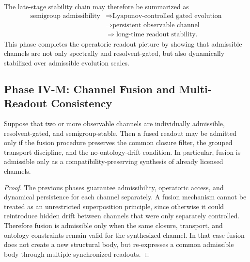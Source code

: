 \begin{remark}\label{rem:semigroup_to_stability_chain}
The late-stage stability chain may therefore be summarized as
\[
\begin{aligned}
\text{semigroup admissibility}
&\Longrightarrow \text{Lyapunov-controlled gated evolution}\\
&\Longrightarrow \text{persistent observable channel}\\
&\Longrightarrow \text{long-time readout stability}.
\end{aligned}
\]
This phase completes the operatoric readout picture by showing that admissible channels are not only spectrally and resolvent-gated, but also dynamically stabilized over admissible evolution scales.
\end{remark}



\subsection*{Phase IV-M: Channel Fusion and Multi-Readout Consistency}

\begin{lemma}\label{lem:admissible_channel_fusion}
Suppose that two or more observable channels are individually admissible, resolvent-gated, and semigroup-stable. Then a fused readout may be admitted only if the fusion procedure preserves the common closure filter, the grouped transport discipline, and the no-ontology-drift condition. In particular, fusion is admissible only as a compatibility-preserving synthesis of already licensed channels.
\end{lemma}
\begin{proof}
The previous phases guarantee admissibility, operatoric access, and dynamical persistence for each channel separately. A fusion mechanism cannot be treated as an unrestricted superposition principle, since otherwise it could reintroduce hidden drift between channels that were only separately controlled. Therefore fusion is admissible only when the same closure, transport, and ontology constraints remain valid for the synthesized channel. In that case fusion does not create a new structural body, but re-expresses a common admissible body through multiple synchronized readouts.
\end{proof}

